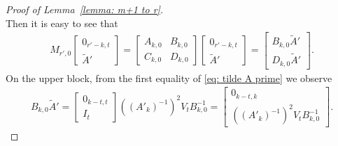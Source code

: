 \documentclass[10pt,a4paper]{amsart}
\begin{document}
\begin{proof}[Proof of Lemma~\ref{lemma: m+1 to r}]
\begin{equation}
    \end{equation}
Then it is easy to see that
    \begin{align*}
        M_{r',0}
        \begin{bmatrix}
            0_{r'-k,t} \\
            \tilde A'
        \end{bmatrix}
        =
        \begin{bmatrix}
            A_{k,0} & B_{k,0} \\
            C_{k,0} & D_{k,0}
        \end{bmatrix}
        \begin{bmatrix}
            0_{r'-k,t} \\
            \tilde A'
        \end{bmatrix}
        =
        \begin{bmatrix}
          B_{k,0}\tilde A' \\
          D_{k,0}\tilde A'
        \end{bmatrix}.
    \end{align*}
On the upper block, from the first equality of \eqref{eq: tilde A prime} we observe
    \begin{align*}
        B_{k,0}\tilde{A}'
        =
        \begin{bmatrix}
            0_{k-t,t} \\
            I_t
        \end{bmatrix}
        ((A'_k)^{-1})^2V_tB_{k,0}^{-1}
        =
        \begin{bmatrix}
            0_{k-t,k} \\
            ((A'_k)^{-1})^2V_tB_{k,0}^{-1}
        \end{bmatrix}.
    \end{align*}





\end{proof}
\end{document}
